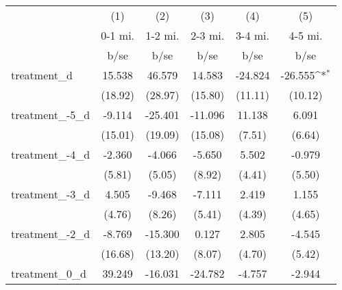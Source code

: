 {
\def\sym#1{\ifmmode^{#1}\else\(^{#1}\)\fi}
\begin{tabular}{l*{5}{c}}
\hline\hline
                    &\multicolumn{1}{c}{(1)}&\multicolumn{1}{c}{(2)}&\multicolumn{1}{c}{(3)}&\multicolumn{1}{c}{(4)}&\multicolumn{1}{c}{(5)}\\
                    &\multicolumn{1}{c}{0-1 mi.}&\multicolumn{1}{c}{1-2 mi.}&\multicolumn{1}{c}{2-3 mi.}&\multicolumn{1}{c}{3-4 mi.}&\multicolumn{1}{c}{4-5 mi.}\\
                    &        b/se         &        b/se         &        b/se         &        b/se         &        b/se         \\
\hline
treatment\_d         &      15.538         &      46.579         &      14.583         &     -24.824         &     -26.555\sym{*}  \\
                    &     (18.92)         &     (28.97)         &     (15.80)         &     (11.11)         &     (10.12)         \\
treatment\_-5\_d      &      -9.114         &     -25.401         &     -11.096         &      11.138         &       6.091         \\
                    &     (15.01)         &     (19.09)         &     (15.08)         &      (7.51)         &      (6.64)         \\
treatment\_-4\_d      &      -2.360         &      -4.066         &      -5.650         &       5.502         &      -0.979         \\
                    &      (5.81)         &      (5.05)         &      (8.92)         &      (4.41)         &      (5.50)         \\
treatment\_-3\_d      &       4.505         &      -9.468         &      -7.111         &       2.419         &       1.155         \\
                    &      (4.76)         &      (8.26)         &      (5.41)         &      (4.39)         &      (4.65)         \\
treatment\_-2\_d      &      -8.769         &     -15.300         &       0.127         &       2.805         &      -4.545         \\
                    &     (16.68)         &     (13.20)         &      (8.07)         &      (4.70)         &      (5.42)         \\
treatment\_0\_d       &      39.249         &     -16.031         &     -24.782         &      -4.757         &      -2.944         \\

\end{tabular}}
